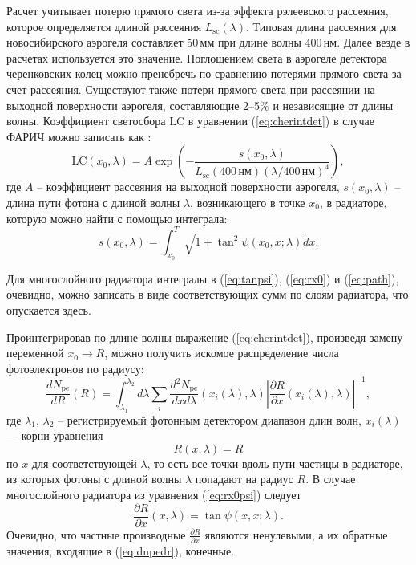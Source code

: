 \documentclass[12pt]{article}
\begin{document}
Расчет учитывает потерю прямого света из-за эффекта рэлеевского рассеяния, которое определяется длиной рассеяния $L_\textrm{sc}(\lambda)$.
Типовая длина рассеяния для новосибирского аэрогеля составляет 50\,мм при длине волны 400\,нм. Далее везде в расчетах используется это значение. 
Поглощением света в аэрогеле детектора черенковских колец можно пренебречь по сравнению потерями прямого света за счет рассеяния. Существуют также потери
прямого света при рассеянии на выходной поверхности аэрогеля, составляющие 2--5\% и независящие от длины волны.
Коэффициент светосбора $\mathrm{LC}$ в уравнении (\ref{eq:cherintdet}) в случае ФАРИЧ можно записать как \cite{aerscat}:
\[\mathrm{LC}(x_0,\lambda) = A \exp\left(-\frac{s(x_0,\lambda)}{L_\textrm{sc}(400\,\textrm{нм})\left(\lambda / 400\,\textrm{нм}\right)^4}\right),\]
где $A$ -- коэффициент рассеяния на выходной поверхности аэрогеля, $s(x_0,\lambda)$ -- длина пути фотона с длиной волны $\lambda$, 
возникающего в точке $x_0$, в радиаторе, которую можно найти с помощью интеграла:
\begin{equation}
s(x_0,\lambda) = \int_{x_0}^T \sqrt{1+\tan^2\psi(x_0,x;\lambda)} dx.
\label{eq:path}
\end{equation}

Для многослойного радиатора интегралы в (\ref{eq:tanpsi}), (\ref{eq:rx0}) и (\ref{eq:path}), очевидно, можно записать в виде соответствующих сумм по слоям радиатора, 
что опускается здесь.

Проинтегрировав по длине волны выражение (\ref{eq:cherintdet}), произведя замену переменной $x_0\to R$, можно получить искомое распределение числа фотоэлектронов по радиусу:
\begin{equation}
\frac{dN_\mathrm{pe}}{dR}(R) = \int_{\lambda_1}^{\lambda_2} d\lambda \sum_i \frac{d^2N_\mathrm{pe}}{dx d\lambda}(x_i(\lambda),\lambda)
\left|\frac{\partial R}{\partial x}(x_i(\lambda),\lambda)\right|^{-1},
\label{eq:dnpedr}
\end{equation}
где $\lambda_1,\,\lambda_2$ -- регистрируемый фотонным детектором диапазон длин волн, $x_i(\lambda)$ --- корни уравнения 
\[R(x,\lambda)=R\] 
по $x$ для соответствующей $\lambda$, то есть все точки вдоль пути частицы в радиаторе, из которых фотоны с длиной волны 
$\lambda$ попадают на радиус $R$. В случае многослойного радиатора из уравнения (\ref{eq:rx0psi}) следует
\[\frac{\partial R}{\partial x}(x,\lambda) = \tan\psi(x,x;\lambda).\]
Очевидно, что частные производные $\frac{\partial R}{\partial x}$ являются ненулевыми, а их обратные значения, входящие в (\ref{eq:dnpedr}), конечные. 
\end{document}
